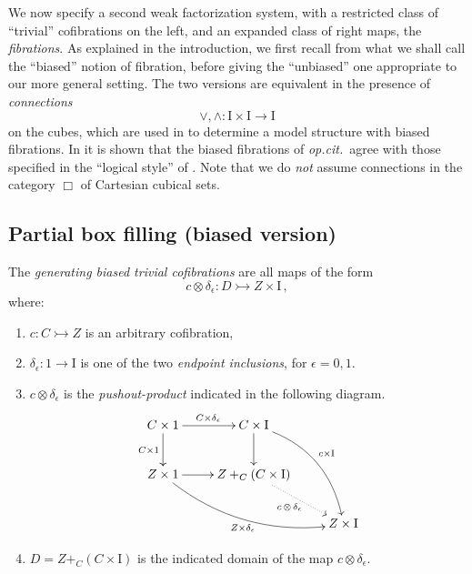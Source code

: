\documentclass[11pt,reqno]{amsart}
\newcommand{\opcit}{\emph{op.cit.}}
\newcommand{\mono}{\ensuremath{\rightarrowtail}}
\newcommand{\ra}{\ensuremath{\rightarrow}}
\newcommand{\too}{\ensuremath{\longrightarrow}}
\newcommand{\I}{\ensuremath{\mathrm{I}}}
\theoremstyle{remark}
\theoremstyle{definition}
\begin{document}
We now specify a second weak factorization system, with a restricted class of ``trivial'' cofibrations on the left, and an expanded class of right maps, the \emph{fibrations}.  As explained in the introduction, we first recall from \cite{GS} what we shall call the ``biased'' notion of fibration, before giving the ``unbiased'' one appropriate to our more general setting.   The two versions are equivalent in the presence of \emph{connections} 
\[
\vee,\wedge : \I\times\I \too \I
\]
 on the cubes, which are used in \cite{Sattler:2017ee} to determine a model structure with biased fibrations.  In \cite{AGH} it is shown that the biased fibrations of \opcit\ agree with those specified in the ``logical style'' of \cite{CCHM:2018ctt,orton-pitts}.    Note that we do \emph{not} assume connections in the category $\Box$ of Cartesian cubical sets.

\subsection*{Partial box filling (biased version)}\label{sec:biasedfibration}

The \emph{generating biased trivial cofibrations} are all maps of the form
\begin{equation}\label{eq:genclassTCof}
c \otimes \delta_\epsilon : D \mono Z\times \I\,,
\end{equation}
where:
\begin{enumerate}
\item  $c : C \mono Z$ is an arbitrary cofibration,

\item $\delta_\epsilon : 1 \ra \I$ is one of the two \emph{endpoint inclusions}, for $\epsilon = 0,1$.

\item $c\otimes\delta_\epsilon$ is the \emph{pushout-product} indicated in the following diagram.
\begin{equation}\label{diagram:pushoutproduct}
\xymatrix{
C\times 1 \ar[d]_{C\times 1} \ar[r]^{C\times \delta_\epsilon} & C\times \I \ar[d] \ar@/^4ex/ [rdd]^{c\times \I}\\
Z\times 1 \ar@/_4ex/ [rrd]_{Z\times \delta_\epsilon} \ar[r] &  Z +_C (C\times\I) \ar@{..>}[rd]_{c\, \otimes\, \delta_\epsilon} \\
&& Z\times\I
}
\end{equation}

\item $D = Z +_C (C\times\I)$ is the indicated domain of the map $c \otimes \delta_\epsilon$.
\end{enumerate}
\end{document}
